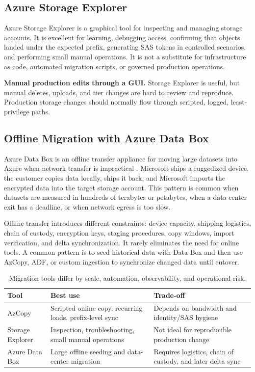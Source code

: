 \subsection{Azure Storage Explorer}
Azure Storage Explorer is a graphical tool for inspecting and managing storage accounts. It is excellent for learning, debugging access, confirming that objects landed under the expected prefix, generating SAS tokens in controlled scenarios, and performing small manual operations. It is not a substitute for infrastructure as code, automated migration scripts, or governed production operations.

\begin{pitfall}
\textbf{Manual production edits through a GUI.} Storage Explorer is useful, but manual deletes, uploads, and tier changes are hard to review and reproduce. Production storage changes should normally flow through scripted, logged, least-privilege paths.
\end{pitfall}

\subsection{Offline Migration with Azure Data Box}
Azure Data Box is an offline transfer appliance for moving large datasets into Azure when network transfer is impractical \cite{microsoft2025databox}. Microsoft ships a ruggedized device, the customer copies data locally, ships it back, and Microsoft imports the encrypted data into the target storage account. This pattern is common when datasets are measured in hundreds of terabytes or petabytes, when a data center exit has a deadline, or when network egress is too slow.

Offline transfer introduces different constraints: device capacity, shipping logistics, chain of custody, encryption keys, staging procedures, copy windows, import verification, and delta synchronization. It rarely eliminates the need for online tools. A common pattern is to seed historical data with Data Box and then use AzCopy, ADF, or custom ingestion to synchronize changed data until cutover.

\begin{table}[H]
\centering
\small
\begin{tabular}{@{}p{3.0cm}p{4.8cm}p{5.0cm}@{}}
\toprule
\textbf{Tool} & \textbf{Best use} & \textbf{Trade-off} \\
\midrule
AzCopy & Scripted online copy, recurring loads, prefix-level sync & Depends on bandwidth and identity/SAS hygiene \\
Storage Explorer & Inspection, troubleshooting, small manual operations & Not ideal for reproducible production change \\
Azure Data Box & Large offline seeding and data-center migration & Requires logistics, chain of custody, and later delta sync \\
\bottomrule
\end{tabular}
\caption{Migration tools differ by scale, automation, observability, and operational risk.}
\label{tab:migration-tools}
\end{table}

